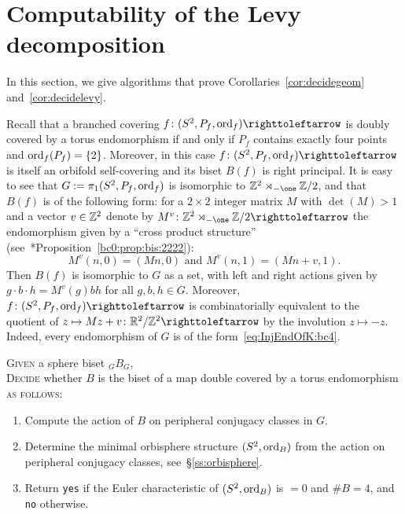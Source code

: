 \documentclass{amsart}
\begin{document}
\section{Computability of the Levy decomposition}\label{ss:algo}
In this section, we give algorithms that prove
Corollaries~\ref{cor:decidegeom} and~\ref{cor:decidelevy}. 

Recall that a branched covering $f\colon (S^2,P_f,\ord_f)\selfmap$ is
doubly covered by a torus endomorphism if and only if $P_f$ contains
exactly four points and $\operatorname{ord}_f(P_f)=\{2\}$. Moreover, in this case
$f\colon (S^2,P_f,\ord_f)\selfmap$ is itself an orbifold self-covering
and its biset $B(f)$ is right principal. It is easy to see that
$G:=\pi_1(S^2,P_f,\operatorname{ord}_f)$ is isomorphic to
$\Z^2 \rtimes_{-\one} \Z/2$, and that $B(f)$ is of the following form:
for a $2\times 2$ integer matrix $M$ with $\det(M)>1$ and a vector
$v\in{\mathbb Z}^2$ denote by $M^v\colon \Z^2 \rtimes_{-\one} \Z/2 \selfmap$
the endomorphism given by a ``cross product structure''
(see~\cite{bartholdi-dudko:bc0}*{Proposition~\ref{bc0:prop:bis:2222}}):
\begin{equation}\label{eq:InjEndOfK:bc4}
  M^{v}(n,0)=(Mn,0) \text{ and }M^{v}(n,1)=(Mn+v,1).
\end{equation}  
Then $B(f)$ is isomorphic to $G$ as a set, with left and right actions
given by $g\cdot b\cdot h=M^v(g)b h$ for all $g,b,h\in G$.  Moreover,
$f\colon (S^2,P_f,\ord_f)\selfmap$ is combinatorially equivalent to
the quotient of $z\mapsto M z+v\colon \R^2/\Z^2\selfmap$ by the
involution $z\mapsto-z$.  Indeed, every endomorphism of $G$ is of the
form~\eqref{eq:InjEndOfK:bc4}.

\begin{algo}\label{algo:is2cover}
  \textsc{Given} a sphere biset ${}_G B_G$,\\
  \textsc{Decide} whether $B$ is the biset of a map double covered by
  a torus endomorphism \textsc{as follows:}\\\upshape
  \begin{enumerate}
  \item Compute the action of $B$ on peripheral conjugacy classes in $G$.
  \item Determine the minimal orbisphere structure $(S^2,\operatorname{ord}_B)$ from
    the action on peripheral conjugacy classes,
    see~\S\ref{ss:orbisphere}.
  \item Return \texttt{yes} if the Euler characteristic of
    $(S^2,\operatorname{ord}_B)$ is $=0$ and $\#B=4$, and \texttt{no} otherwise.
  \end{enumerate}
\end{algo}
\end{document}

